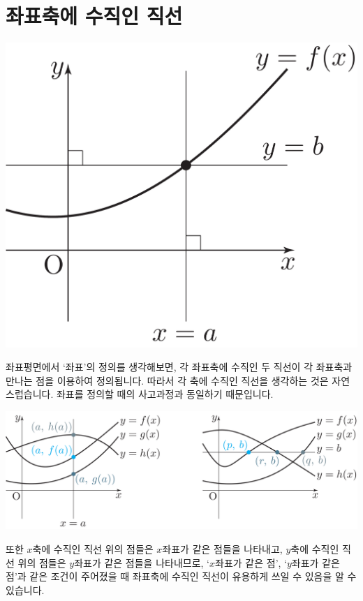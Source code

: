 \section{좌표축에 수직인 직선}
\begin{center}
\includegraphics[scale=.125]{pic0/pic169.pdf}
  \end{center}좌표평면에서 `좌표'의 정의를 생각해보면, 각 좌표축에 수직인 두 직선이 각 좌표축과 만나는 점을 이용하여 정의됩니다. 따라서 각 축에 수직인 직선을 생각하는 것은 자연스럽습니다. 좌표를 정의할 때의 사고과정과 동일하기 때문입니다.
\begin{center}
\includegraphics[scale=.125]{pic0/pic170.pdf}
  \end{center}또한 $x$축에 수직인 직선 위의 점들은 $x$좌표가 같은 점들을 나타내고, $y$축에 수직인 직선 위의 점들은 $y$좌표가 같은 점들을 나타내므로, `$x$좌표가 같은 점', `$y$좌표가 같은 점'과 같은 조건이 주어졌을 때 좌표축에 수직인 직선이 유용하게 쓰일 수 있음을 알 수 있습니다. 
\clearpage
